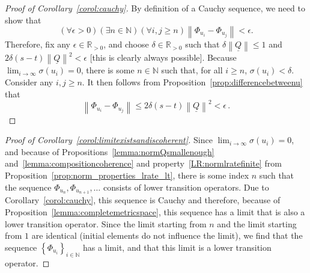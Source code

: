 \documentclass[10pt,a4paper]{paper}
\theoremstyle{definition}
\newcommand{\nats}{\mathbb{N}}
\newcommand{\reals}{\mathbb{R}}
\newcommand{\realspos}{\reals_{>0}}
\newcommand{\lrate}{\underline{Q}}
\newcommand{\norm}[1]{\left\lVert #1 \right\rVert}
\begin{document}
\begin{proof}[Proof of Corollary~\ref{corol:cauchy}]
By definition of a Cauchy sequence, we need to show that
\begin{equation*}
(\forall \epsilon>0)(\exists n\in\nats)(\forall i,j\geq n)
\norm{\Phi_{u_i}-\Phi_{u_j}}<\epsilon.
\end{equation*}
Therefore, fix any $\epsilon\in\realspos$, and choose $\delta\in\realspos$ such that $\delta\norm{\lrate}\leq 1$ and $2\delta(s-t)\norm{\lrate}^2<\epsilon$ [this is clearly always possible]. Because $\lim_{i\to\infty}\sigma(u_i)=0$, there is some $n\in\nats$ such that, for all $i\geq n$, $\sigma(u_i)<\delta$. Consider any $i,j\geq n$. It then follows from Proposition~\ref{prop:differencebetweenu} that
\begin{equation*}
\norm{\Phi_{u_i}-\Phi_{u_j}} \leq 2\delta(s-t)\norm{\lrate}^2 < \epsilon\,.
\end{equation*}
\end{proof}

\begin{proof}[Proof of Corollary~\ref{corol:limitexistsandiscoherent}]
Since $\lim_{i\to\infty}\sigma(u_i)=0$, and because of Propositions~\ref{lemma:normQsmallenough} and~\ref{lemma:compositioncoherence} and property~\ref{LR:normlratefinite} from Proposition~\ref{prop:norm_properties_lrate_lt}, there is some index $n$ such that the sequence $\Phi_{u_n},\Phi_{u_{n+1}},\ldots$ consists of lower transition operators. Due to Corollary~\ref{corol:cauchy}, this sequence is Cauchy and therefore, because of Proposition~\ref{lemma:completemetricspace}, this sequence has a limit that is also a lower transition operator. Since the limit starting from $n$ and the limit starting from $1$ are identical (initial elements do not influence the limit), we find that the sequence $\left\{\Phi_{u_i}\right\}_{i\in\nats}$ has a limit, and that this limit is a lower transition operator.
\end{proof}
\end{document}
